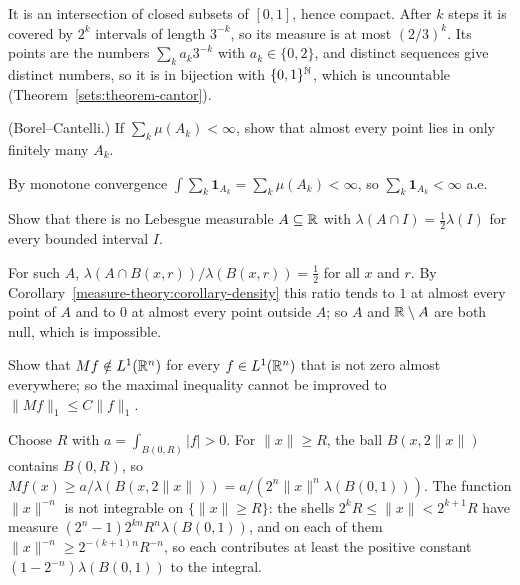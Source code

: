 \begin{solution}
It is an intersection of closed subsets of $[0, 1]$, hence compact. After $k$ steps it is covered by $2^k$ intervals of length $3^{-k}$, so its measure is at most $(2/3)^k$. Its points are the numbers
$\sum_k a_k3^{-k}$ with $a_k \in \{0, 2\}$, and distinct sequences give distinct numbers, so it is in bijection with $\{0, 1\}^{\mathbb{N}}$, which is uncountable (Theorem~\ref{sets:theorem-cantor}).
\end{solution}

\begin{exercise}\label{measure-theory:exercise-borel-cantelli}
(Borel--Cantelli.) If $\sum_k\mu(A_k) < \infty$, show that almost every point lies in only finitely many $A_k$.
\end{exercise}

\begin{solution}
By monotone convergence $\int\sum_k\mathbf{1}_{A_k} = \sum_k\mu(A_k) < \infty$, so $\sum_k\mathbf{1}_{A_k} < \infty$ a.e.
\end{solution}

\begin{exercise}\label{measure-theory:exercise-no-half-density}
Show that there is no Lebesgue measurable $A \subseteq \mathbb{R}$ with $\lambda(A \cap I) = \frac12\lambda(I)$ for every bounded interval $I$.
\end{exercise}

\begin{solution}
For such $A$, $\lambda(A \cap B(x, r))/\lambda(B(x, r)) = \frac12$ for all $x$ and $r$. By Corollary~\ref{measure-theory:corollary-density} this ratio tends to $1$ at
almost every point of $A$ and to $0$ at almost every point outside $A$; so $A$ and $\mathbb{R} \setminus A$ are both null, which is impossible.
\end{solution}

\begin{exercise}\label{measure-theory:exercise-maximal-not-integrable}
Show that $Mf \notin L^1(\mathbb{R}^n)$ for every $f \in L^1(\mathbb{R}^n)$ that is not zero almost everywhere; so the maximal inequality cannot be improved to
$\|Mf\|_1 \leq C\|f\|_1$.
\end{exercise}

\begin{solution}
Choose $R$ with $a = \int_{B(0, R)}|f| > 0$. For $\|x\| \geq R$, the ball $B(x, 2\|x\|)$ contains $B(0, R)$, so
$Mf(x) \geq a/\lambda(B(x, 2\|x\|)) = a/(2^n\|x\|^n\lambda(B(0, 1)))$. The function $\|x\|^{-n}$ is not integrable on $\{\|x\| \geq R\}$: the shells
$2^kR \leq \|x\| < 2^{k+1}R$ have measure $(2^n - 1)2^{kn}R^n\lambda(B(0, 1))$, and on each of them $\|x\|^{-n} \geq 2^{-(k+1)n}R^{-n}$, so each contributes at least the
positive constant $(1 - 2^{-n})\lambda(B(0, 1))$ to the integral.
\end{solution}

